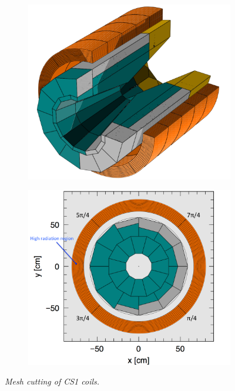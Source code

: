  \begin{figure}[H]
  \begin{subfigure}{0.25\textwidth}
   \centering
   \includegraphics[scale=0.23]{chapter5/fig/heatgeo1.pdf}
  \end{subfigure}
  \hspace{0.2\textwidth}
  \begin{subfigure}{0.27\textwidth}
   \centering
   \includegraphics[scale=0.23]{chapter5/fig/heatgeo2.pdf}
  \end{subfigure}
  \caption{\it Mesh cutting of CS1 coils.}
  \label{4geoh}
 \end{figure}
